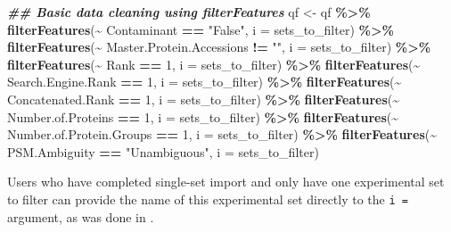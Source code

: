 \documentclass[9pt,a4paper,]{extarticle}
\newenvironment{Shaded}{\begin{snugshade}}{\end{snugshade}}
\newcommand{\AttributeTok}[1]{\textcolor[rgb]{0.13,0.29,0.53}{#1}}
\newcommand{\DecValTok}[1]{\textcolor[rgb]{0.00,0.00,0.81}{#1}}
\newcommand{\DocumentationTok}[1]{\textcolor[rgb]{0.56,0.35,0.01}{\textbf{\textit{#1}}}}
\newcommand{\FunctionTok}[1]{\textcolor[rgb]{0.13,0.29,0.53}{\textbf{#1}}}
\newcommand{\NormalTok}[1]{#1}
\newcommand{\OtherTok}[1]{\textcolor[rgb]{0.56,0.35,0.01}{#1}}
\newcommand{\SpecialCharTok}[1]{\textcolor[rgb]{0.81,0.36,0.00}{\textbf{#1}}}
\newcommand{\StringTok}[1]{\textcolor[rgb]{0.31,0.60,0.02}{#1}}
\begin{document}
\begin{Shaded}
\begin{Highlighting}[]
\DocumentationTok{\#\# Basic data cleaning using filterFeatures}
\NormalTok{qf }\OtherTok{\textless{}{-}}\NormalTok{ qf }\SpecialCharTok{\%\textgreater{}\%}
  \FunctionTok{filterFeatures}\NormalTok{(}\SpecialCharTok{\textasciitilde{}}\NormalTok{ Contaminant }\SpecialCharTok{==} \StringTok{"False"}\NormalTok{, }\AttributeTok{i =}\NormalTok{ sets\_to\_filter) }\SpecialCharTok{\%\textgreater{}\%}
  \FunctionTok{filterFeatures}\NormalTok{(}\SpecialCharTok{\textasciitilde{}}\NormalTok{ Master.Protein.Accessions }\SpecialCharTok{!=} \StringTok{""}\NormalTok{, }\AttributeTok{i =}\NormalTok{ sets\_to\_filter) }\SpecialCharTok{\%\textgreater{}\%}
  \FunctionTok{filterFeatures}\NormalTok{(}\SpecialCharTok{\textasciitilde{}}\NormalTok{ Rank }\SpecialCharTok{==} \DecValTok{1}\NormalTok{, }\AttributeTok{i =}\NormalTok{ sets\_to\_filter) }\SpecialCharTok{\%\textgreater{}\%}
  \FunctionTok{filterFeatures}\NormalTok{(}\SpecialCharTok{\textasciitilde{}}\NormalTok{ Search.Engine.Rank }\SpecialCharTok{==} \DecValTok{1}\NormalTok{, }\AttributeTok{i =}\NormalTok{ sets\_to\_filter) }\SpecialCharTok{\%\textgreater{}\%} 
  \FunctionTok{filterFeatures}\NormalTok{(}\SpecialCharTok{\textasciitilde{}}\NormalTok{ Concatenated.Rank }\SpecialCharTok{==} \DecValTok{1}\NormalTok{, }\AttributeTok{i =}\NormalTok{ sets\_to\_filter) }\SpecialCharTok{\%\textgreater{}\%}
  \FunctionTok{filterFeatures}\NormalTok{(}\SpecialCharTok{\textasciitilde{}}\NormalTok{ Number.of.Proteins }\SpecialCharTok{==} \DecValTok{1}\NormalTok{, }\AttributeTok{i =}\NormalTok{ sets\_to\_filter) }\SpecialCharTok{\%\textgreater{}\%}
  \FunctionTok{filterFeatures}\NormalTok{(}\SpecialCharTok{\textasciitilde{}}\NormalTok{ Number.of.Protein.Groups }\SpecialCharTok{==} \DecValTok{1}\NormalTok{, }\AttributeTok{i =}\NormalTok{ sets\_to\_filter) }\SpecialCharTok{\%\textgreater{}\%}
  \FunctionTok{filterFeatures}\NormalTok{(}\SpecialCharTok{\textasciitilde{}}\NormalTok{ PSM.Ambiguity }\SpecialCharTok{==} \StringTok{"Unambiguous"}\NormalTok{, }\AttributeTok{i =}\NormalTok{ sets\_to\_filter)}
\end{Highlighting}
\end{Shaded}

Users who have completed single-set import and only have one experimental set
to filter can provide the name of this experimental set directly to the
\texttt{i\ =} argument, as was done in \citet{Hutchings2023}.
\end{document}
